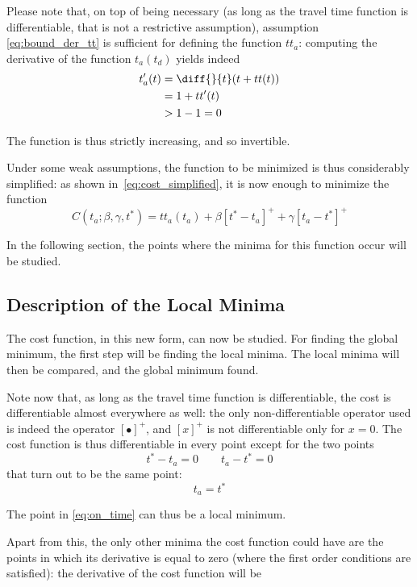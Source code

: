 Please note that, on top of being necessary (as long as the travel time function is differentiable, that is not a restrictive assumption),
assumption \eqref{eq:bound_der_tt} is sufficient for defining the function \(tt_a\):
computing the derivative of the function \(t_a(t_d)\) yields indeed
\begin{align*}
  t_a'(t) & = \diff{}{t}(t + tt(t)) \\
          & = 1 + tt'(t) \\
          & > 1 - 1 = 0
\end{align*}

The function is thus strictly increasing, and so invertible.

Under some weak assumptions, the function to be minimized is thus considerably simplified:
as shown in~\eqref{eq:cost_simplified}, it is now enough to minimize the function
\begin{equation}
  \label{eq:cost_simplified_final}
  C(t_a; \beta, \gamma, t^*) = tt_a(t_a) + \beta [t^* - t_a]^+ + \gamma [t_a - t^*]^+
\end{equation}

In the following section,
the points where the minima for this function occur will be studied.

\subsection{Description of the Local Minima}
\label{sec:local_min}

The cost function, in this new form, can now be studied.
For finding the global minimum, the first step will be finding the local minima.
The local minima will then be compared, and the global minimum found.

Note now that, as long as the travel time function is differentiable,
the cost is differentiable almost everywhere as well:
the only non-differentiable operator used is indeed the operator \([\bullet ]^+\),
and \([x]^+\) is not differentiable only for \(x = 0\).
The cost function is thus differentiable in every point except for the two points
\[ t^* - t_a = 0 \qquad t_a - t^* = 0 \]
that turn out to be the same point:
\begin{equation}
  \label{eq:on_time}
  t_a = t^*
\end{equation}

The point in \eqref{eq:on_time} can thus be a local minimum.

Apart from this, the only other minima the cost function could have are the points in which its derivative is equal to zero (where the first order conditions are satisfied):
the derivative of the cost function will be

